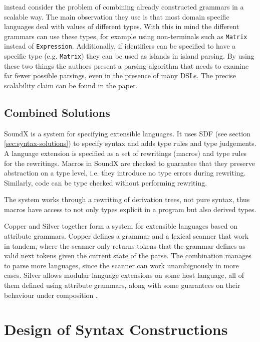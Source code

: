 \documentclass{kththesis}
\begin{document}
\textcite{Silkensen2013Well-Typed-Isla} instead consider the problem of combining already constructed grammars in a scalable way. The main observation they use is that most domain specific languages deal with values of different types. With this in mind the different grammars can use these types, for example using non-terminals such as \texttt{Matrix} instead of \texttt{Expression}. Additionally, if identifiers can be specified to have a specific type (e.g. \texttt{Matrix}) they can be used as islands in island parsing. By using these two things the authors present a parsing algorithm that needs to examine far fewer possible parsings, even in the presence of many DSLs. The precise scalability claim can be found in the paper.

\section{Combined Solutions} \label{sec:full-solutions}

SoundX \cite{Lorenzen2016Sound-type-depe} is a system for specifying extensible languages. It uses SDF (see section \ref{sec:syntax-solutions}) to specify syntax and adds type rules and type judgements. A language extension is specified as a set of rewritings (macros) and type rules for the rewritings. Macros in SoundX are checked to guarantee that they preserve abstraction on a type level, i.e. they introduce no type errors during rewriting. Similarly, code can be type checked without performing rewriting.

The system works through a rewriting of derivation trees, not pure syntax, thus macros have access to not only types explicit in a program but also derived types.

Copper \cite{Van-Wyk2007Context-aware-s} and Silver \cite{Van-Wyk2010Silver:-An-exte} together form a system for extensible languages based on attribute grammars. Copper defines a grammar and a lexical scanner that work in tandem, where the scanner only returns tokens that the grammar defines as valid next tokens given the current state of the parse. The combination manages to parse more languages, since the scanner can work unambiguously in more cases. Silver allows modular language extensions on some host language, all of them defined using attribute grammars, along with some guarantees on their behaviour under composition \cite{Kaminski2017Reliably-compos}.

\chapter{Design of Syntax Constructions} \label{sec:syntax-constructions}
\end{document}
